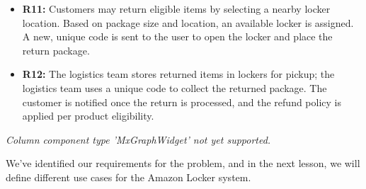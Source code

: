 \noindent
\begin{minipage}[t]{0.48\textwidth}\vspace{0pt}
\begin{itemize}
\item
\textbf{R11:} Customers may return eligible items by selecting a nearby locker location. Based on package size and location, an available locker is assigned. A new, unique code is sent to the user to open the locker and place the return package.
\item
\textbf{R12:} The logistics team stores returned items in lockers for pickup; the logistics team uses a unique code to collect the returned package. The customer is notified once the return is processed, and the refund policy is applied per product eligibility.
\end{itemize}
\end{minipage}
\hfill
\begin{minipage}[t]{0.48\textwidth}\vspace{0pt}
\textit{Column component type 'MxGraphWidget' not yet supported.}
\end{minipage}

We've identified our requirements for the problem, and in the next lesson, we will define different use cases for the Amazon Locker system.

